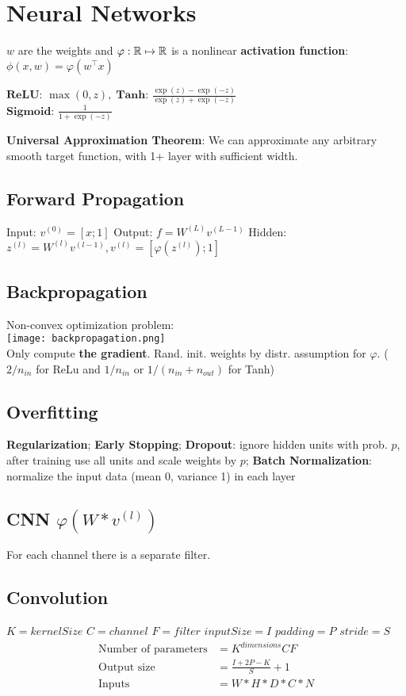 \section*{Neural Networks}
$w$ are the weights and $\varphi: \mathbb{R} \mapsto \mathbb{R}$ is a nonlinear \textbf{activation function}: $\phi(x, w) = \varphi(w^\top x)$


$\textbf{ReLU: } \max (0,z), \; \textbf{Tanh: } \frac{\exp(z) - \exp(-z)}{\exp(z) + \exp(-z)}$ \\[-3pt]
$\textbf{Sigmoid: } \frac{1}{1 + \exp(-z)}$


\textbf{Universal Approximation Theorem}: We can approximate any arbitrary smooth target function, with 1+ layer with sufficient width.

\subsection*{Forward Propagation}

Input: $v^{(0)} = [x; 1]$ \quad Output: $f = W^{(L)} v^{(L-1)}$
Hidden: $z^{(l)} = W^{(l)} v^{(l-1)}, v^{(l)} = [\varphi(z^{(l)}); 1]$


\subsection*{Backpropagation}

Non-convex optimization problem: \\[-10pt]

\texttt{[image: backpropagation.png]} \\[-15pt]

Only compute \color{Red} \textbf{the gradient}\color{Black}. Rand. init. weights by distr. assumption for $\varphi$. ( $2 / n_{in}$ for ReLu and $1/n_{in}$ or $ 1/ (n_{in} + n_{out})$ for Tanh)

\subsection*{Overfitting}
\textbf{Regularization}; \textbf{Early Stopping}; \textbf{Dropout}: ignore hidden units with prob. $p$, after training use all units and scale weights by $p$; \textbf{Batch Normalization}: normalize the input data (mean 0, variance 1) in each layer

\subsection*{CNN \quad \color{Black}$\varphi(W * v^{(l)})$}
For each channel there is a separate filter.

\subsection*{Convolution}
    $K = kernelSize$ $C = channel$ $F = filter$ $inputSize = I$ $padding = P$
    $stride = S$ 
\begin{align*}
    \text{Number of parameters} &= K^{dimensions} C F\\
    \text{Output size} &= \frac{I + 2P - K}{S} + 1\\
    \text{Inputs} &= W * H * D * C * N
\end{align*}

